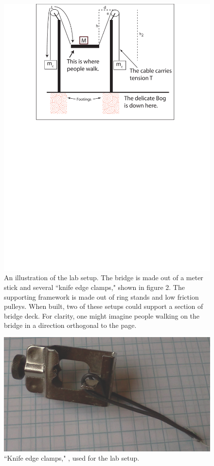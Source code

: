 \documentclass[12pt]{iopart}
\begin{document}
\begin{figure}[h!]
\centering
\includegraphics[width=\columnwidth]{boardwalk.pdf}  
\caption{An illustration of the lab setup.  The bridge is made out of a meter stick and several ``knife edge clamps," shown in figure 2. The supporting framework is made out of ring stands and low friction pulleys.  When built, two of these setups could support a section of bridge deck.  For clarity, one might imagine people walking on the bridge in a direction orthogonal to the page. }
\label{fig:overview}
\end{figure}
 
\begin{figure}[h!]
\centering
\includegraphics[width=\columnwidth]{hanger.png}
\caption{
``Knife edge clamps," \cite{clamps}, used for the lab setup.  
}
\label{fig:picture}
\end{figure}
 
\end{document}
